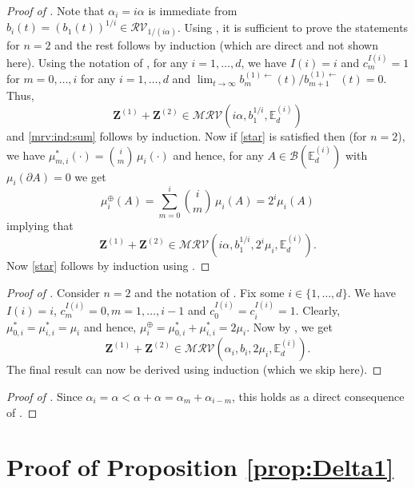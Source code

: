 \documentclass[aos]{imsart}
\numberwithin{equation}{section}
\theoremstyle{plain} %
\theoremstyle{remark}
\newcommand{\E}{\mathbb{E}}
\def\MRV{\mathcal{MRV}}
\def\RV{\mathcal{RV}}
\def\cB{\mathcal{B}}
\def\bZ{\boldsymbol Z}
\begin{document}
\begin{proof}[Proof of ]
Note that $\alpha_i=i\alpha$ is immediate from $b_i(t)=(b_1(t))^{1/i} \in \RV_{1/(i\alpha)}$. Using , it is sufficient to prove the statements for $n=2$ and the rest follows by induction (which are direct and not shown here).
Using the notation of , for any $i=1,\ldots, d$, we have $I(i)=i$ and $c_m^{I(i)}=1$ for $m=0,\ldots,i$ for any $i=1,\ldots, d$ and $\lim_{t\to\infty}b_m^{(1)\leftarrow}(t)/b_{m+1}^{(1)\leftarrow}(t)=0.$ Thus,
 $$ \bZ^{(1)} + \bZ^{(2)} \in\MRV(i\alpha,b_1^{1/i},\E_d^{(i)}) $$
 and \eqref{mrv:ind:sum} follows by induction. Now  if  \eqref{star} is satisfied then (for $n=2$), we have $\mu_{m,i}^*(\cdot)=\binom i m \, \mu_i(\cdot)$ and hence, for any $A\in \cB(\E_d^{(i)})$ with $\mu_i(\partial A)=0$ we get
  $$\mu_i^{\oplus}(A)=\sum_{m=0}^{i}\binom i m\, \mu_i(A)=2^{i}\mu_i(A)$$
 implying that
 $$ \bZ^{(1)} + \bZ^{(2)} \in\MRV(i\alpha,b_1^{1/i},2^{i}\mu_i, \E_d^{(i)}).$$
Now \eqref{star} follows by induction using .
\end{proof}

\begin{proof}[Proof of ]
Consider $n=2$ and the notation of . Fix some $i\in \{1, \ldots, d\}$. We have $I(i)=i$, $c_m^{I(i)}=0, m=1, \ldots, i-1$ and $c_0^{I(i)}=c_i^{I(i)}=1$. Clearly, $\mu^*_{0,i} =\mu^*_{i,i} = \mu_i$ and hence, $\mu^{\oplus}_i = \mu^*_{0,i}+\mu^*_{i,i}= 2\mu_i.$
Now by , we get
\[\bZ^{(1)}+\bZ^{(2)}\in\MRV(\alpha_i,b_i,2\mu_i,\E_d^{(i)}).\]
The final result can now be derived using induction (which we skip here).
\end{proof}

\begin{proof}[Proof of ]
Since $\alpha_i=\alpha<\alpha+\alpha=\alpha_{m}+\alpha_{i-m}$, this holds as a direct consequence of .
\end{proof}


\section{Proof of Proposition \ref{prop:Delta1}} \label{sec:proofpropDelta1}
\end{document}
